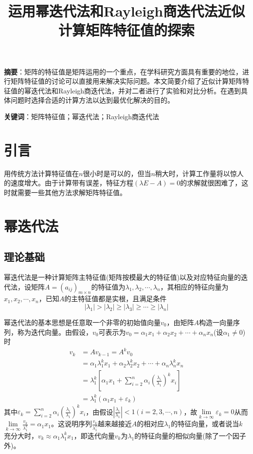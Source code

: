 \documentclass[UTF8]{ctexart}
\title{\heiti 运用幂迭代法和Rayleigh商迭代法近似计算矩阵特征值的探索}
\author{}
\date{}
\begin{document}
    \maketitle
    \textbf{摘要}：矩阵的特征值是矩阵运用的一个重点，在学科研究方面具有重要的地位，进行矩阵特征值的讨论可以直接用来解决实际问题。本文简要介绍了近似计算矩阵特征值的幂迭代法和Rayleigh商迭代法，并对二者进行了实验和对比分析。在遇到具体问题时选择合适的计算方法以达到最优化解决的目的。

    \textbf{关键词}：矩阵特征值；幂迭代法；Rayleigh商迭代法
    \section{引言}
    用传统方法计算特征值在$n$很小时是可以的，但当$n$稍大时，计算工作量将以惊人的速度增大。由于计算带有误差，特征方程$(\lambda E-A)=0$的求解就很困难了，这时就需要一些其他方法求解矩阵特征值。
    \section{幂迭代法}
    \subsection{理论基础}
    幂迭代法是一种计算矩阵主特征值(矩阵按模最大的特征值)以及对应特征向量的迭代法，设矩阵$A=(a_{ij})_{m \times n}$的特征值为$\lambda_1,\lambda_2,\cdots,\lambda_n$，其相应的特征向量为$x_1,x_2,\cdots,x_n$，已知$A$的主特征值都是实根，且满足条件
    \[|\lambda_1|>|\lambda_2|\geq|\lambda_3|\geq\cdots\geq|\lambda_n|\]

    幂迭代法的基本思想是任意取一个非零的初始值向量$v_0$，由矩阵$A$构造一向量序列，称为迭代向量。由假设，$v_0$可表示为$v_0=\alpha_1x_1+\alpha_2x_2+\cdots+\alpha_nx_n$(设$\alpha_1 \neq 0$)时
    \begin{align*}
        v_k&=Av_{k-1}=A^kv_0\\
        &=\alpha_1\lambda_1^kx_1+\alpha_2\lambda_2^kx_2+\cdots+\alpha_n\lambda_n^kx_n\\
        &=\lambda_1^k\left[\alpha_1x_1+\sum\limits_{i=2}^n \alpha_i\left(\frac{\lambda_i}{\lambda_1}\right)^kx_i\right]\\
        &=\lambda_1^k(\alpha_1x_1+\varepsilon_k)
    \end{align*}
    其中$\displaystyle \varepsilon_k=\sum\limits_{i=2}^n \alpha_i\left(\frac{\lambda_i}{\lambda_1}\right)^kx_i$，由假设$\displaystyle \left|\frac{\lambda_i}{\lambda_1}\right|<1(i=2,3,\cdots,n)$，故$\displaystyle \lim\limits_{k\to\infty} \varepsilon_k=0$从而$\displaystyle \lim\limits_{k\to\infty} \frac{v_k}{\lambda_1^k}=\alpha_1x_1$。这说明序列$\displaystyle \frac{v_k}{\lambda_1^k}$越来越接近$A$的相对应$\lambda_1$的特征向量，或者说当$k$充分大时，$v_k\approx\alpha_1\lambda_1^kx_1$，即迭代向量$v_k$为$\lambda_1$的特征向量的相似向量(除了一个因子外)。
\end{document}
